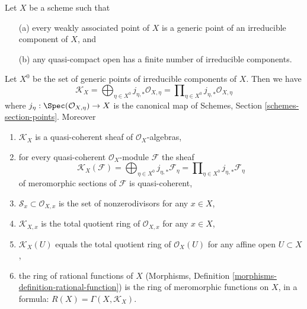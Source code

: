 \begin{lemma}
\label{lemma-meromorphic-weakass-finite}
Let $X$ be a scheme such that
\begin{enumerate}
\item[(a)] every weakly associated point of $X$ is a generic point of an
irreducible component of $X$, and
\item[(b)] any quasi-compact open has a finite number of irreducible components.
\end{enumerate}
Let $X^0$ be the set of generic points of irreducible components of $X$.
Then we have
$$
\mathcal{K}_X =
\bigoplus\nolimits_{\eta \in X^0} j_{\eta, *}\mathcal{O}_{X, \eta} =
\prod\nolimits_{\eta \in X^0} j_{\eta, *}\mathcal{O}_{X, \eta}
$$
where $j_\eta : \Spec(\mathcal{O}_{X, \eta}) \to X$ is the canonical map
of Schemes, Section \ref{schemes-section-points}. Moreover
\begin{enumerate}
\item $\mathcal{K}_X$ is a quasi-coherent sheaf of
$\mathcal{O}_X$-algebras,
\item for every quasi-coherent $\mathcal{O}_X$-module $\mathcal{F}$ the sheaf
$$
\mathcal{K}_X(\mathcal{F}) =
\bigoplus\nolimits_{\eta \in X^0} j_{\eta, *}\mathcal{F}_\eta =
\prod\nolimits_{\eta \in X^0} j_{\eta, *}\mathcal{F}_\eta
$$
of meromorphic sections of $\mathcal{F}$
is quasi-coherent,
\item $\mathcal{S}_x \subset \mathcal{O}_{X, x}$
is the set of nonzerodivisors for any $x \in X$,
\item $\mathcal{K}_{X, x}$ is the total quotient ring of $\mathcal{O}_{X, x}$
for any $x \in X$,
\item $\mathcal{K}_X(U)$ equals the total quotient ring of $\mathcal{O}_X(U)$
for any affine open $U \subset X$,
\item the ring of rational functions of $X$
(Morphisms, Definition \ref{morphisms-definition-rational-function})
is the ring of meromorphic
functions on $X$, in a formula: $R(X) = \Gamma(X, \mathcal{K}_X)$.
\end{enumerate}
\end{lemma}

